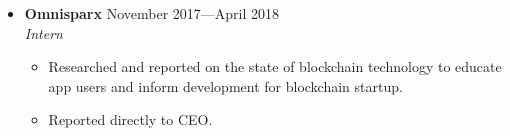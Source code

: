 \documentclass[12pt,letterpaper]{article}
\newenvironment{explist}
{\begin{itemize}[label=\textbf{--},itemsep=1pt,topsep=0pt,partopsep=0pt,parsep=0pt]}
{\end{itemize}}
\begin{document}
\begin{itemize}[label=]
    \item
    \textbf{Omnisparx} \hfill November 2017---April 2018\\
    \textit{Intern}
    \begin{explist}
        \item Researched and reported on the state of blockchain technology to educate app users and inform development for blockchain startup.
        \item Reported directly to CEO.
    \end{explist}

\end{itemize}
\end{document}

